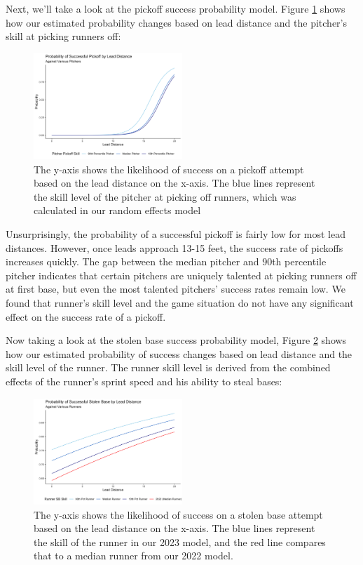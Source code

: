 \documentclass{article}
\begin{document}
      
        Next, we'll take a look at the pickoff success probability model. Figure \ref{fig:prob-pickoff-success}  shows how our estimated probability changes based on lead distance and the pitcher's skill at picking runners off:
    
        \begin{figure}
          \label{fig:prob-pickoff-success}
          \centering
          \includegraphics[width = 0.5\textwidth]{figures/prob_pickoff_success.png}
          \caption{The y-axis shows the likelihood of success on a pickoff attempt based on the lead distance on the x-axis. The blue lines represent the skill level of the pitcher at picking off runners, which was calculated in our random effects model}
        \end{figure}

        Unsurprisingly, the probability of a successful pickoff is fairly low for most lead distances. However, once leads approach 13-15 feet, the success rate of pickoffs increases quickly. The gap between the median pitcher and 90th percentile pitcher indicates that certain pitchers are uniquely talented at picking runners off at first base, but even the most talented pitchers' success rates remain low. We found that runner's skill level and the game situation do not have any significant effect on the success rate of a pickoff.

       
        Now taking a look at the stolen base success probability model, Figure \ref{fig:prob-sb-success}  shows how our estimated probability of success changes based on lead distance and the skill level of the runner. The runner skill level is derived from the combined effects of the runner's sprint speed and his ability to steal bases:

    
        \begin{figure}
          \label{fig:prob-sb-success}
          \centering
          \includegraphics[width = 0.5\textwidth]{figures/prob_sb_success.png}
          \caption{The y-axis shows the likelihood of success on a stolen base attempt based on the lead distance on the x-axis. The blue lines represent the skill of the runner in our 2023 model, and the red line compares that to a median runner from our 2022 model.}
        \end{figure}
    
\end{document}
